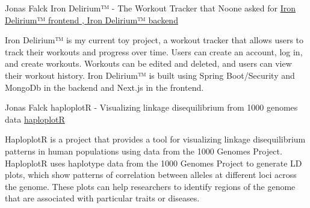

\begin{cventries}
\cventry
  {Jonas Falck}
  { Iron Delirium™ - The Workout Tracker that Noone asked for } %
  {
\href{ https://github.com/joe-nas/workout-app-frontend-next }{ Iron Delirium™ frontend },\href{ https://github.com/joe-nas/workout-app }{ Iron Delirium™ backend }}
  {} %
  {    
  \begin{cvitems} %
    \item { Iron Delirium™ is my current toy project, a workout tracker that allows users to track their workouts and progress over time. Users can create an account, log in, and create workouts. Workouts can be edited and deleted, and users can view their workout history. Iron Delirium™ is built using Spring Boot/Security and MongoDb in the backend and Next.js in the frontend. }
  \end{cvitems}
  }
\cventry
  {Jonas Falck}
  { haploplotR - Visualizing linkage disequilibrium from 1000 genomes data } %
  {
\href{ https://github.com/joe-nas/haploplotR }{ haploplotR }}
  {} %
  {    
  \begin{cvitems} %
    \item { HaploplotR is a project that provides a tool for visualizing linkage disequilibrium patterns in human populations using data from the 1000 Genomes Project. HaploplotR uses haplotype data from the 1000 Genomes Project to generate LD plots, which show patterns of correlation between alleles at different loci across the genome. These plots can help researchers to identify regions of the genome that are associated with particular traits or diseases. }
  \end{cvitems}
  }
\end{cventries}